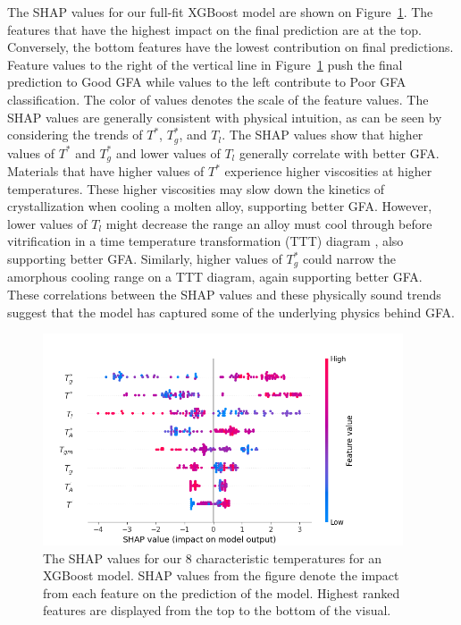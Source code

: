 \documentclass[11pt,a4paper]{article}                                %
\begin{document}
\par
The SHAP values for our full-fit XGBoost model are shown on Figure~\ref{shap}. The features that have the highest impact on the final prediction are at the top. Conversely, the bottom features have the lowest contribution on final predictions. Feature values to the right of the vertical line in Figure~\ref{shap} push the final prediction to Good GFA while values to the left contribute to Poor GFA classification. The color of values denotes the scale of the feature values. The SHAP values are generally consistent with physical intuition, as can be seen by considering the trends of $T^{*}$, $T_{g}^{*}$, and $T_{l}$. The SHAP values show that higher values of $T^{*}$ and $T_{g}^{*}$ and lower values of $T_{l}$ generally correlate with better GFA. Materials that have higher values of $T^{*}$ experience higher viscosities at higher temperatures. These higher viscosities may slow down the kinetics of crystallization when cooling a molten alloy, supporting better GFA. However, lower values of $T_{l}$ might decrease the range an alloy must cool through before vitrification in a time temperature transformation (TTT) diagram \cite{Musgraves2019}, also supporting better GFA. Similarly, higher values of $T_{g}^{*}$ could narrow the amorphous cooling range on a TTT diagram, again supporting better GFA. These correlations between the SHAP values and these physically sound trends suggest that the model has captured some of the underlying physics behind GFA.

\begin{figure}[H]
\centering
\includegraphics[width=0.95\textwidth]{figures/shap.png}
\caption{The SHAP values for our 8 characteristic temperatures for an XGBoost model. SHAP values from the figure denote the impact from each feature on the prediction of the model. Highest ranked features are displayed from the top to the bottom of the visual.}
\label{shap}
\end{figure}
\end{document}
